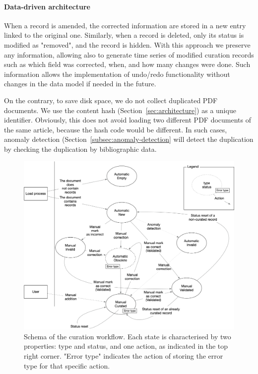 \documentclass[a4paper]{article}
\begin{document}
\paragraph{Data-driven architecture} When a record is amended, the corrected information are stored in a new entry linked to the original one. 
Similarly, when a record is deleted, only its status is modified as "removed", and the record is hidden. 
With this approach we preserve any information, allowing also to generate time series of modified curation records such as which field was corrected, when, and how many changes were done. 
Such information allows the implementation of undo/redo functionality without changes in the data model if needed in the future. 

On the contrary, to save disk space, we do not collect duplicated PDF documents. We use the content hash (Section~\ref{sec:architecture}) as a unique identifier.
Obviously, this does not avoid loading two different PDF documents of the same article, because the hash code would be different. In such cases, anomaly detection (Section~\ref{subsec:anomaly-detection} will detect the duplication by checking the duplication by bibliographic data. 


\begin{figure}[ht]
  \centering
  \includegraphics[width=1\textwidth]{images/record-correction} 
  \caption{Schema of the curation workflow. Each state is characterised by two properties: type and status, and one action, as indicated in the top right corner. "Error type" indicates the action of storing the error type for that specific action.}
  \label{fig:curation-workflow}
\end{figure}
\end{document}
